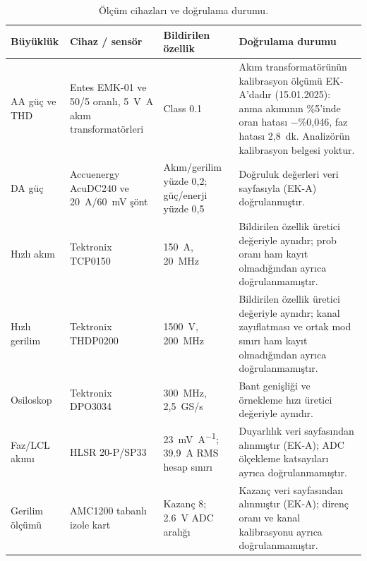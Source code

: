 \begin{table}[H]
  \centering
  \caption{Ölçüm cihazları ve doğrulama durumu.}
  \label{tab:olcum-cihazlari}
  \footnotesize
  \begin{tabularx}{\textwidth}{>{\raggedright\arraybackslash}p{} >{\raggedright\arraybackslash}p{} >{\raggedright\arraybackslash}p{} >{\raggedright\arraybackslash}X}
    \toprule
    Büyüklük & Cihaz / sensör & Bildirilen özellik & Doğrulama durumu \\
    \midrule
    AA güç ve THD & Entes EMK-01 ve 50/5 oranlı, \SI{5}{\volt\ampere} akım transformatörleri & Class 0.1 & Akım transformatörünün kalibrasyon ölçümü EK-A'dadır (15.01.2025): anma akımının \%5'inde oran hatası $-$\%0,046, faz hatası 2,8~dk. Analizörün kalibrasyon belgesi yoktur. \\
    DA güç & Accuenergy AcuDC240 ve \SI{20}{\ampere}/\SI{60}{\milli\volt} şönt & Akım/gerilim yüzde 0,2; güç/enerji yüzde 0,5 & Doğruluk değerleri veri sayfasıyla (EK-A) doğrulanmıştır. \\
    Hızlı akım & Tektronix TCP0150 & \SI{150}{\ampere}, \SI{20}{\mega\hertz} & Bildirilen özellik üretici değeriyle aynıdır; prob oranı ham kayıt olmadığından ayrıca doğrulanmamıştır. \\
    Hızlı gerilim & Tektronix THDP0200 & \SI{1500}{\volt}, \SI{200}{\mega\hertz} & Bildirilen özellik üretici değeriyle aynıdır; kanal zayıflatması ve ortak mod sınırı ham kayıt olmadığından ayrıca doğrulanmamıştır. \\
    Osiloskop & Tektronix DPO3034 & \SI{300}{\mega\hertz}, 2,5~GS/s & Bant genişliği ve örnekleme hızı üretici değeriyle aynıdır. \\
    Faz/LCL akımı & HLSR 20-P/SP33 & \SI{23}{\milli\volt\per\ampere}; \SI{39.9}{\ampere} RMS hesap sınırı & Duyarlılık veri sayfasından alınmıştır (EK-A); ADC ölçekleme katsayıları ayrıca doğrulanmamıştır. \\
    Gerilim ölçümü & AMC1200 tabanlı izole kart & Kazanç 8; \SI{2.6}{\volt} ADC aralığı & Kazanç veri sayfasından alınmıştır (EK-A); direnç oranı ve kanal kalibrasyonu ayrıca doğrulanmamıştır. \\
    \bottomrule
  \end{tabularx}
\end{table}

